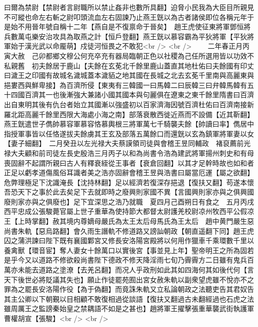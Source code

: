 曰爾為禁尉【禁尉者言尉職所以禁止姦非也數所具翻】迫脅小民我為大臣目所親見不可縱也命左右斬之尉叩頭流血左右固諫乃止燕王皝以為古者諸侯即位各稱元年于是始不用晉年號自稱十二年【燕自是不復禀命于晉矣】　趙王虎使征東將軍鄧恒將兵數萬屯樂安治攻具為取燕之計【恒戶登翻】燕王皝以慕容霸為平狄將軍【平狄將軍始于漢光武以命龎萌】戍徒河恒畏之不敢犯<br />
<br />
　　二年春正月丙寅大赦　己卯都鄉文穆公何充卒充有器局臨朝正色以社稷為己任所選用皆以功效不私親舊　初夫餘居于鹿山【夫餘在玄莬北千餘里鹿山蓋直其地杜佑曰夫餘國有印丈曰濊王之印國有故城名濊城蓋本濊貊之地其國在長城之北去玄莬千里南與高麗東與挹婁西與鮮卑接】為百濟所侵【東夷有三韓國一曰馬韓二曰辰韓三曰弁韓馬韓有五十四國百濟其一也後漸強大兼諸小國其國本與句麗俱在遼東之東千餘里隋書曰百濟出自東明其後有仇台者始立其國漸以強盛初以百家濟海因號百濟杜佑曰百濟南接新羅北距高麗千餘里西限大海處小海之南】部落衰散西徙近燕而不設備【近其靳翻】燕王皝遣世子儁帥慕容軍慕容恪慕輿根三將軍萬七千騎襲夫餘【帥讀曰率】儁居中指授軍事皆以任恪遂拔夫餘虜其王玄及部落五萬餘口而還皝以玄為鎮軍將軍妻以女【妻子細翻】　二月癸丑以左光禄大夫蔡謨領司徒與會稽王昱同輔政　褚裒薦前光禄大夫顧和前司徒左長史殷浩三月丙子以和為尚書令浩為建武將軍揚州刺史和有母喪固辭不起謂所親曰古人有釋衰絰從王事者【衰倉回翻】以其才足幹時故也如和者正足以虧孝道傷風俗耳識者美之浩亦固辭會稽王昱與浩書曰屬當厄運【屬之欲翻】危弊理極足下沈識淹長【沈持林翻】足以經濟若復深存挹退【復扶又翻】苟遂本懷吾恐天下之事於此去矣足下去就即時之廢興則家國不異【言國興則家亦與之俱興國廢則家亦與之俱廢也】足下宜深思之浩乃就職　夏四月己酉朔日有食之　五月丙戌西平忠成公張駿薨官屬上世子重華為使持節大都督太尉護羌校尉凉州牧西平公假凉王【上時掌翻】赦其境内尊嫡母嚴氏為太王太后母馬氏為王太后　趙中黄門嚴生惡尚書朱軌【惡烏路翻】會久雨生譖軌不修道路又謗訕朝政【朝直遥翻下同】趙王虎囚之蒲洪諫曰陛下既有襄國鄴宮又修長安洛陽宮殿將以何用作獵車千乘環數千里以養禽獸【環音宦】奪人妻女十餘萬口以實後宮【事並見上年】聖帝明王之所為固若是乎今又以道路不修欲殺尚書陛下德政不修天降淫雨七旬乃霽霽方二日雖有鬼兵百萬亦未能去道路之塗潦【去羌呂翻】而况人乎政刑如此其如四海何其如後代何【言天下後世必將貶議其失也】願止作徒罷苑囿出宮女赦朱軌以副衆望虎雖不悅亦不之罪為之罷長安洛陽作役【為于偽翻】而竟誅朱軌又立私論朝政之法聽吏告其君奴告其主公卿以下朝覲以目相顧不敢復相過從談語【復扶又翻過古未翻經過也石虎之法雖周厲王之監謗秦始皇之禁耦語不如是之甚也】趙將軍王擢擊張重華襲武街執護軍曹權胡宣【張駿】<br />
<br />
